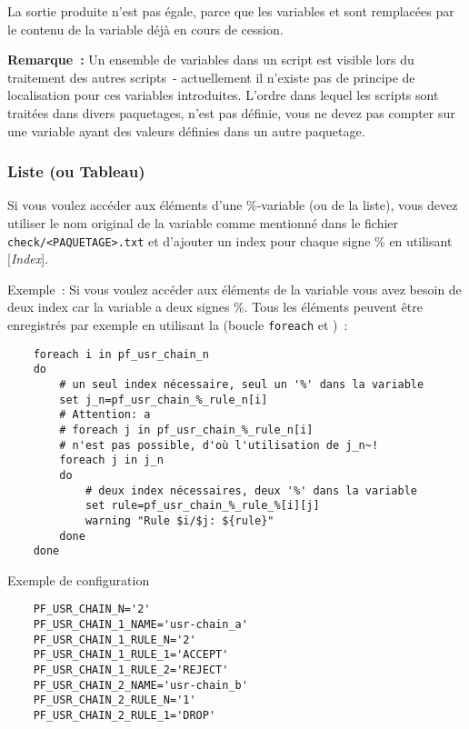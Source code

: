     La sortie produite n'est \og{}pas égale\fg{}, parce que les variables  et
     sont remplacées par le contenu de la variable  déjà en cours de cession.

    \textbf{Remarque~:} Un ensemble de variables dans un script est visible lors du traitement
	des autres scripts~- actuellement il n'existe pas de principe de localisation pour ces
	variables introduites. L'ordre dans lequel les scripts sont traitées dans divers paquetages,
	n'est pas définie, vous ne devez pas compter sur une variable ayant des valeurs définies
	dans un autre paquetage.


\subsubsection{Liste (ou Tableau)}

    Si vous voulez accéder aux éléments d'une \%-variable (ou de la liste),
	vous devez utiliser le nom original de la variable comme mentionné dans le fichier
	\texttt{check/<PAQUETAGE>.txt} et d'ajouter un index pour chaque signe \og{}\%\fg{}
	en utilisant \og{}[\emph{Index}]\fg{}.

    Exemple~: Si vous voulez accéder aux éléments de la variable 
	vous avez besoin de deux index car la variable a deux signes \og{}\%\fg{}. Tous
	les éléments peuvent être enregistrés par exemple en utilisant la (boucle \texttt{foreach}
	et )~:

\begin{example}
\begin{verbatim}
    foreach i in pf_usr_chain_n
    do
        # un seul index nécessaire, seul un '%' dans la variable
        set j_n=pf_usr_chain_%_rule_n[i]
        # Attention: a
        # foreach j in pf_usr_chain_%_rule_n[i]
        # n'est pas possible, d'où l'utilisation de j_n~!
        foreach j in j_n
        do
            # deux index nécessaires, deux '%' dans la variable
            set rule=pf_usr_chain_%_rule_%[i][j]
            warning "Rule $i/$j: ${rule}"
        done
    done
\end{verbatim}
\end{example}

    Exemple de configuration

\begin{example}
\begin{verbatim}
    PF_USR_CHAIN_N='2'
    PF_USR_CHAIN_1_NAME='usr-chain_a'
    PF_USR_CHAIN_1_RULE_N='2'
    PF_USR_CHAIN_1_RULE_1='ACCEPT'
    PF_USR_CHAIN_1_RULE_2='REJECT'
    PF_USR_CHAIN_2_NAME='usr-chain_b'
    PF_USR_CHAIN_2_RULE_N='1'
    PF_USR_CHAIN_2_RULE_1='DROP'
\end{verbatim}
\end{example}

